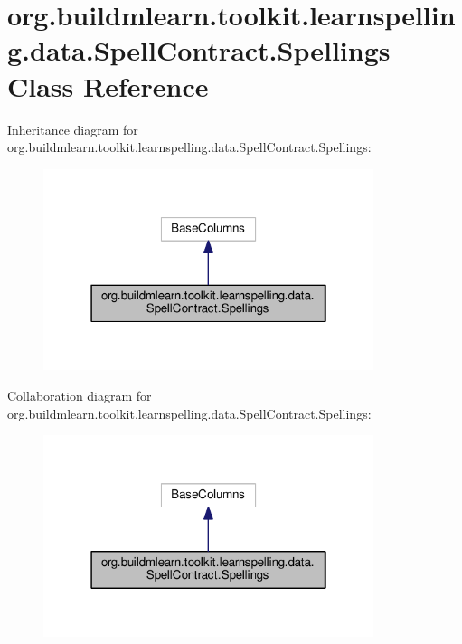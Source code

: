 \hypertarget{classorg_1_1buildmlearn_1_1toolkit_1_1learnspelling_1_1data_1_1SpellContract_1_1Spellings}{}\section{org.\+buildmlearn.\+toolkit.\+learnspelling.\+data.\+Spell\+Contract.\+Spellings Class Reference}
\label{classorg_1_1buildmlearn_1_1toolkit_1_1learnspelling_1_1data_1_1SpellContract_1_1Spellings}


Inheritance diagram for org.\+buildmlearn.\+toolkit.\+learnspelling.\+data.\+Spell\+Contract.\+Spellings\+:
\nopagebreak
\begin{figure}[H]
\begin{center}
\leavevmode
\includegraphics[width=274pt]{classorg_1_1buildmlearn_1_1toolkit_1_1learnspelling_1_1data_1_1SpellContract_1_1Spellings__inherit__graph}
\end{center}
\end{figure}


Collaboration diagram for org.\+buildmlearn.\+toolkit.\+learnspelling.\+data.\+Spell\+Contract.\+Spellings\+:
\nopagebreak
\begin{figure}[H]
\begin{center}
\leavevmode
\includegraphics[width=274pt]{classorg_1_1buildmlearn_1_1toolkit_1_1learnspelling_1_1data_1_1SpellContract_1_1Spellings__coll__graph}
\end{center}
\end{figure}
